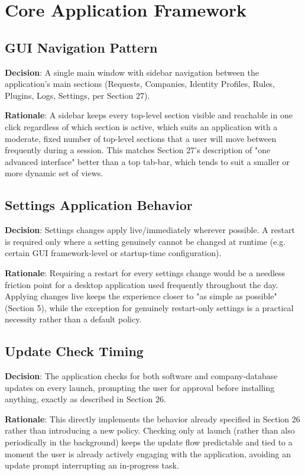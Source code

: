 \chapter{Core Application Framework}

\section{GUI Navigation Pattern}
\textbf{Decision}: A single main window with sidebar navigation between the application's main sections (Requests, Companies, Identity Profiles, Rules, Plugins, Logs, Settings, per Section 27).

\textbf{Rationale}: A sidebar keeps every top-level section visible and reachable in one click regardless of which section is active, which suits an application with a moderate, fixed number of top-level sections that a user will move between frequently during a session. This matches Section 27's description of "one advanced interface" better than a top tab-bar, which tends to suit a smaller or more dynamic set of views.
\section{Settings Application Behavior}
\textbf{Decision}: Settings changes apply live/immediately wherever possible. A restart is required only where a setting genuinely cannot be changed at runtime (e.g. certain GUI framework-level or startup-time configuration).

\textbf{Rationale}: Requiring a restart for every settings change would be a needless friction point for a desktop application used frequently throughout the day. Applying changes live keeps the experience closer to "as simple as possible" (Section 5), while the exception for genuinely restart-only settings is a practical necessity rather than a default policy.
\section{Update Check Timing}
\textbf{Decision}: The application checks for both software and company-database updates on every launch, prompting the user for approval before installing anything, exactly as described in Section 26.

\textbf{Rationale}: This directly implements the behavior already specified in Section 26 rather than introducing a new policy. Checking only at launch (rather than also periodically in the background) keeps the update flow predictable and tied to a moment the user is already actively engaging with the application, avoiding an update prompt interrupting an in-progress task.
